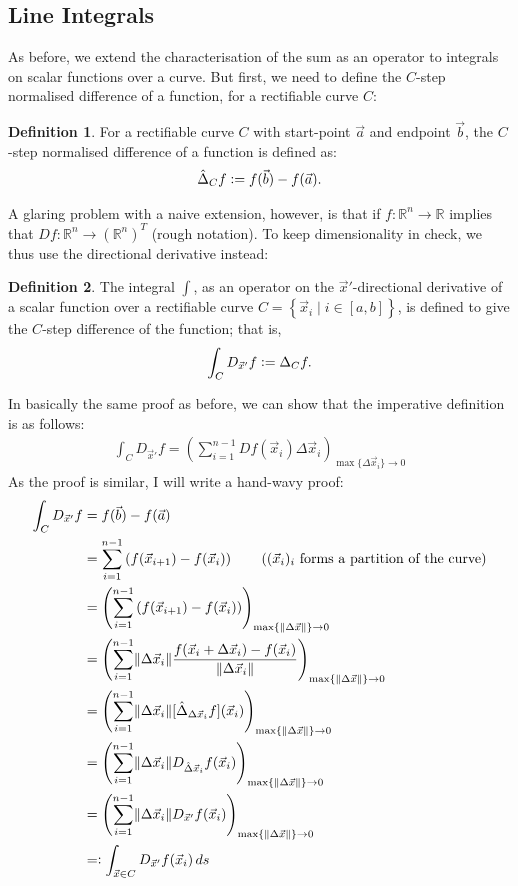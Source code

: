 \documentclass{article}
\theoremstyle{definition}
\newtheorem{defn}{Definition}[subsubsection]
\begin{document}
\subsection{Line Integrals}
As before, we extend the characterisation of the sum as an operator to integrals on scalar functions over a curve. But first, we need to define the $C$-step normalised difference of a function, for a rectifiable curve $C$:
\begin{defn}
	For a rectifiable curve $C$ with start-point $\vec a$ and endpoint $\vec b$, the $C$-step normalised difference of a function is defined as:
	\begin{align*}
		\hat{\Delta}_Cf\vcentcolon=f(\vec b)-f(\vec a).
	\end{align*}
\end{defn}
A glaring problem with a naive extension, however, is that if $f:\mathbb{R}^n\rightarrow \mathbb{R}$ implies that $Df:\mathbb{R}^n\rightarrow (\mathbb{R}^n)^T$ (rough notation). To keep dimensionality in check, we thus use the directional derivative instead:
\begin{defn}
	The integral $\int$, as an operator on the $\vec x'$-directional derivative of a scalar function over a rectifiable curve $C=\left\{\vec x_i\mid i\in[a,b]\right\}$, is defined to give the $C$-step difference of the function; that is,
	\begin{align*}
		\int_{C}D_{\vec x'}f\vcentcolon=\Delta_Cf.
	\end{align*}
\end{defn}
In basically the same proof as before, we can show that the imperative definition is as follows:
\begin{align*}
	\int_{C}D_{\vec x'}f=\left(\sum_{i=1}^{n-1}Df(\vec x_i)\Delta \vec x_i\right)_{\max\{\Delta \vec x_i\}\rightarrow0}
\end{align*}
As the proof is similar, I will write a hand-wavy proof:
\begin{align*}
	\int_{C}D_{\vec x'}f&=f(\vec b)-f(\vec a)\\
	&=\sum_{i=1}^{n-1}\left(f(\vec x_{i+1})-f(\vec x_i)\right)\tag*{($(\vec x_i)_i$ forms a partition of the curve)}\\
	&=\left(\sum_{i=1}^{n-1}\left(f(\vec x_{i+1})-f(\vec x_i)\right)\right)_{\max\{\left\lVert\Delta\vec x\right\rVert\}\rightarrow0}\\
	&=\left(\sum_{i=1}^{n-1}\lVert\Delta\vec x_i\rVert\frac{f(\vec x_{i}+\Delta\vec x_i)-f(\vec x_i)}{\lVert\Delta\vec x_i\rVert}\right)_{\max\{\left\lVert\Delta\vec x\right\rVert\}\rightarrow0}\\
	&=\left(\sum_{i=1}^{n-1}\lVert\Delta\vec x_i\rVert[\hat{\Delta}_{\Delta\vec x_i}f](\vec x_i)\right)_{\max\{\left\lVert\Delta\vec x\right\rVert\}\rightarrow0}\\
	&=\left(\sum_{i=1}^{n-1}\lVert\Delta\vec x_i\rVert D_{\hat{\Delta}\vec x_i}f(\vec x_i)\right)_{\max\{\left\lVert\Delta\vec x\right\rVert\}\rightarrow0}\\
	&=\left(\sum_{i=1}^{n-1}\lVert\Delta\vec x_i\rVert D_{\vec x'}f(\vec x_i)\right)_{\max\{\left\lVert\Delta\vec x\right\rVert\}\rightarrow0}\\
	&=\vcentcolon\int_{\vec x\in C}D_{\vec x'}f(\vec x_i)\,ds
\end{align*}
\end{document}
